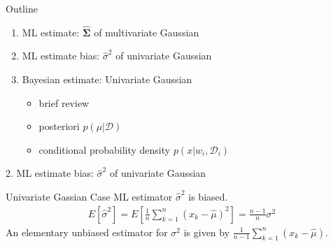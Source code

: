 \documentclass[compress,blue]{beamer}
\newcommand{\bSig}{\mathbf{\Sigma}}
\newcommand{\calD}{\mathcal{D}}
\begin{document}
\begin{frame}{Outline}
	\begin{enumerate}
		\item<1-> ML estimate: $\hat{\bSig}$ of multivariate Gaussian 
		\vspace{0.1in}
		\item<2-> ML estimate bias: $\hat{\sigma}^2$ of univariate Gaussian
		\vspace{0.1in}
		\item<0> Bayesian estimate: Univariate Gaussian
		\begin{itemize}
			\item brief review
			\item posteriori $p(\mu|\calD)$
			\item conditional probability density $p(x | w_i, \calD_i)$
		\end{itemize}
	\end{enumerate}
\end{frame}

\begin{frame}{2. ML estimate bias: $\hat{\sigma}^2$ of univariate Gaussian}
	\begin{block}{Univariate Gassian Case}
		ML estimator $\hat{\sigma}^2$ is biased.
		\pause
		\begin{align}
			E[\hat{\sigma}^2] = E[\frac{1}{n}\sum_{k=1}^{n}(x_k-\hat{\mu})^2] = \frac{n-1}{n}\sigma^2
		\end{align}
		\small
		\pause
		An elementary unbiased estimator for $\sigma^2$ is given by $\frac{1}{n-1}\sum_{k=1}^n(x_k - \hat{\mu})$.
		\normalsize
	\end{block}	
\end{frame}
\end{document}

